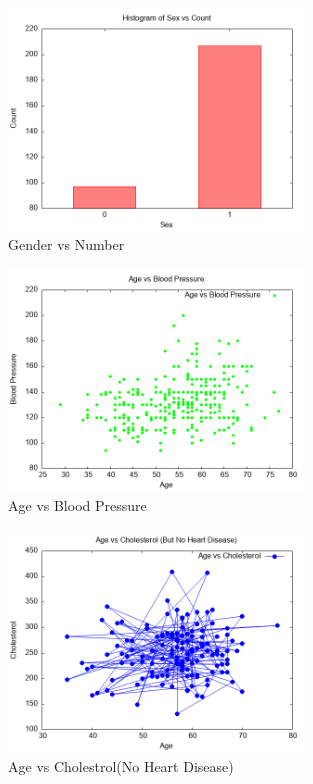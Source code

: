 \documentclass{article}
\begin{document}
\begin{figure}[H]
\centering
\includegraphics[width=0.7\textwidth]{4a.png}
\caption{Gender vs Number}
\label{fig:sample_figure1}
\end{figure}
\begin{figure}[H]
\centering
\includegraphics[width=0.7\textwidth]{4b.png}
\caption{Age vs Blood Pressure}
\label{fig:sample_figure2}
\end{figure}
\begin{figure}[H]
\centering
\includegraphics[width=0.7\textwidth]{4c.png}
\caption{Age vs Cholestrol(No Heart Disease)}
\label{fig:sample_figure3}
\end{figure}
\end{document}
